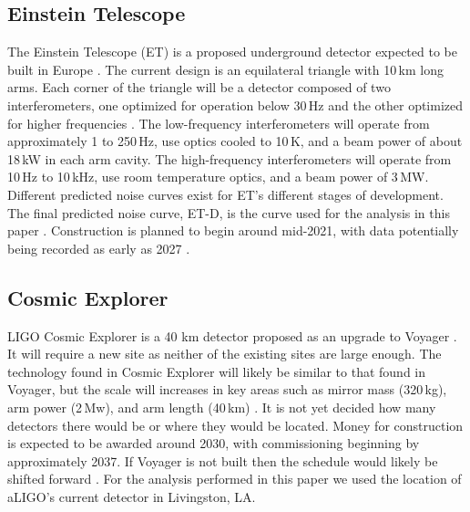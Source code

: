 \documentclass[letterpaper, aps, prd, twocolumn, superscriptaddress, showpacs, nofootinbib]{revtex4}
\begin{document}
\subsection{Einstein Telescope}

The Einstein Telescope (ET) is a proposed underground detector expected to be built in Europe \cite{0264-9381-27-19-194002}. The current design is an equilateral triangle with 10\,km long arms. Each corner of the triangle will be a detector composed of two interferometers, one optimized for operation below 30\,Hz and the other optimized for higher frequencies \cite{ET:design}. The low-frequency interferometers will operate from approximately 1 to 250\,Hz, use optics cooled to 10\,K, and a beam power of about 18\,kW in each arm cavity. The high-frequency interferometers will operate from 10\,Hz to 10\,kHz, use room temperature optics, and a beam power of 3\,MW. Different predicted noise curves exist for ET's different stages of development. The final predicted noise curve, ET-D, is the curve used for the analysis in this paper \cite{ET:design}. Construction is planned to begin around mid-2021, with data potentially being recorded as early as 2027 \cite{ET:design, whitepaper2018}.

\subsection{Cosmic Explorer}

LIGO Cosmic Explorer is a 40 km detector proposed as an upgrade to Voyager \cite{2017CQGra..34d4001A}. It will require a new site as neither of the existing sites are large enough. The technology found in Cosmic Explorer will likely be similar to that found in Voyager, but the scale will increases in key areas such as mirror mass (320\,kg), arm power (2\,Mw), and arm length (40\,km) \cite{whitepaper2018}. It is not yet decided how many detectors there would be or where they would be located. Money for construction is expected to be awarded around 2030, with commissioning beginning by approximately 2037. If Voyager is not built then the schedule would likely be shifted forward \cite{whitepaper2018}. For the analysis performed in this paper we used the location of aLIGO's current detector in Livingston, LA.

\end{document}
